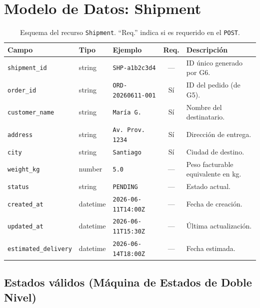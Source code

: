 \documentclass[11pt, a4paper]{article}
\begin{document}
\section{Modelo de Datos: Shipment}
\label{sec:modelo}

\begin{table}[ht!]
\centering
\renewcommand{\arraystretch}{1.4}
\begin{tabularx}{\textwidth}{l l l c X}
  \toprule
  \textbf{Campo} & \textbf{Tipo} & \textbf{Ejemplo} & \textbf{Req.} & \textbf{Descripción} \\
  \midrule
  \texttt{shipment\_id}        & string   & \texttt{SHP-a1b2c3d4}        & ---  & ID único generado por G6. \\
  \texttt{order\_id}           & string   & \texttt{ORD-20260611-001}     & Sí   & ID del pedido (de G5). \\
  \texttt{customer\_name}      & string   & \texttt{María G.}             & Sí   & Nombre del destinatario. \\
  \texttt{address}             & string   & \texttt{Av. Prov. 1234}       & Sí   & Dirección de entrega. \\
  \texttt{city}                & string   & \texttt{Santiago}             & Sí   & Ciudad de destino. \\
  \texttt{weight\_kg}          & number   & \texttt{5.0}                  & ---  & Peso facturable equivalente en kg. \\
  \texttt{status}              & string   & \texttt{PENDING}              & ---  & Estado actual. \\
  \texttt{created\_at}         & datetime & \texttt{2026-06-11T14:00Z}    & ---  & Fecha de creación. \\
  \texttt{updated\_at}         & datetime & \texttt{2026-06-11T15:30Z}    & ---  & Última actualización. \\
  \texttt{estimated\_delivery} & datetime & \texttt{2026-06-14T18:00Z}    & ---  & Fecha estimada. \\
  \bottomrule
\end{tabularx}
\caption{Esquema del recurso \texttt{Shipment}. ``Req.'' indica si es requerido en el \texttt{POST}.}
\end{table}


\subsection{Estados válidos (Máquina de Estados de Doble Nivel)}
\label{sec:estados}
\end{document}
